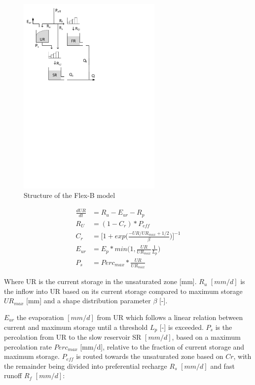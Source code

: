 { 																	%
\begin{figure}
\includegraphics[trim=1cm 17.5cm 7cm 1cm,width=7cm,keepaspectratio]{./AppA_files/21_schematic.pdf}
\caption{Structure of the Flex-B model} \label{fig:21_schematic}
\end{figure}

\begin{align}
	\frac{dUR}{dt} &= R_u - E_{ur} - R_p \\
	R_U &= (1 - C_r) * P_{eff}\\
	C_r &= \Big[1+exp\Big(\frac{-UR/UR_{max} + 1/2}{\beta}\Big)\Big]^{-1}\\
	E_{ur} &= E_p * min\Big(1, \frac{UR}{UR_{max}} \frac{1}{L_p}\Big)\\
	P_s&= Perc_{max} * \frac{UR}{UR_{max}}
\end{align}
  
Where UR is the current storage in the unsaturated zone [mm]. $R_u$ $[mm/d]$ is the inflow into UR based on its current storage compared to maximum storage $UR_{max}$ [mm] and a shape distribution parameter $\beta$ [-]. 

} %

$E_{ur}$ the evaporation $[mm/d]$ from UR which follows a linear relation between current and maximum storage until a threshold $L_p$ [-] is exceeded. $P_s$ is the percolation from UR to the slow reservoir SR $[mm/d]$, based on a maximum percolation rate $Perc_{max}$ [mm/d], relative to the fraction of current storage and maximum storage. $P_{eff}$ is routed towards the unsaturated zone based on $Cr$, with the remainder being divided into preferential recharge $R_s$ $[mm/d]$ and fast runoff $R_f$ $[mm/d]$:

